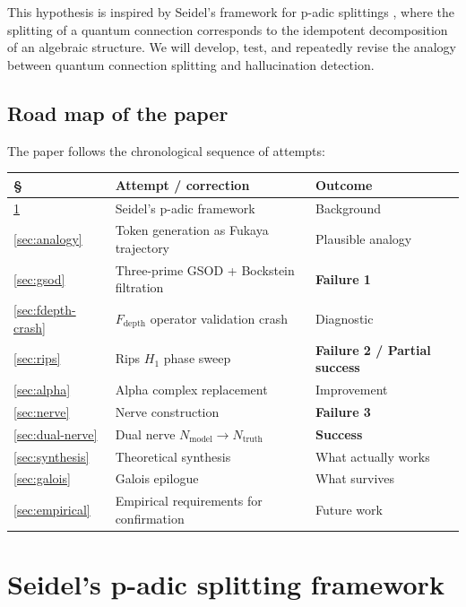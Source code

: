 \documentclass[11pt]{amsart}
\theoremstyle{definition}
\newcommand{\Nmod}{N_{\mathrm{model}}}
\newcommand{\Ntruth}{N_{\mathrm{truth}}}
\begin{document}
This hypothesis is inspired by Seidel's framework for p-adic splittings
\cite{Seidel25}, where the splitting of a quantum connection corresponds to
the idempotent decomposition of an algebraic structure.
We will develop, test, and repeatedly revise the analogy between
quantum connection splitting and hallucination detection.

\subsection{Road map of the paper}

The paper follows the chronological sequence of attempts:

\begin{center}
\begin{tabularx}{\textwidth}{lXl}
\toprule
\S & Attempt / correction & Outcome \\
\midrule
\ref{sec:seidel} & Seidel's p-adic framework & Background \\
\ref{sec:analogy} & Token generation as Fukaya trajectory & Plausible analogy \\
\ref{sec:gsod} & Three-prime GSOD + Bockstein filtration & \textbf{Failure 1} \\
\ref{sec:fdepth-crash} & $F_\mathrm{depth}$ operator validation crash & Diagnostic \\
\ref{sec:rips} & Rips $H_1$ phase sweep & \textbf{Failure 2 / Partial success} \\
\ref{sec:alpha} & Alpha complex replacement & Improvement \\
\ref{sec:nerve} & Nerve construction & \textbf{Failure 3} \\
\ref{sec:dual-nerve} & Dual nerve $\Nmod \to \Ntruth$ & \textbf{Success} \\
\ref{sec:synthesis} & Theoretical synthesis & What actually works \\
\ref{sec:galois} & Galois epilogue & What survives \\
\ref{sec:empirical} & Empirical requirements for confirmation & Future work \\
\bottomrule
\end{tabularx}
\end{center}

\section{Seidel's p-adic splitting framework}
\label{sec:seidel}
\end{document}
